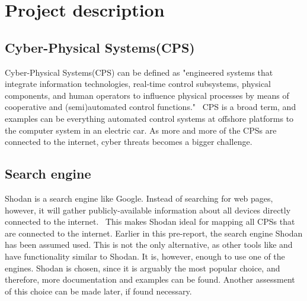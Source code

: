\section{Project description} \label{sec:desc}

\subsection{Cyber-Physical Systems(CPS)}\label{sec:cps}
Cyber-Physical Systems(CPS) can be defined as "engineered systems that integrate information technologies, real‐time control subsystems, physical components, and human operators to influence physical processes by means of cooperative and (semi)automated control functions."~\cite{guzman_wied_kozine_lundteigen_2019}
CPS is a broad term, and examples can be everything automated control systems at offshore platforms to the computer system in an electric car. As more and more of the CPSs are connected to the internet, cyber threats becomes a bigger challenge. 

\subsection{Search engine} \label{sec:shodan}
Shodan is a search engine like Google. Instead of searching for web pages, however, it will gather publicly-available information about all devices directly connected to the internet.~\cite{shodan} This makes Shodan ideal for mapping all CPSs that are connected to the internet. 
Earlier in this pre-report, the search engine Shodan has been assumed used. This is not the only alternative, as other tools like \href{https://censys.io/}{\color{blue}{Censys}} and \href{www.zoomeye.org}{\color{blue}{ZoomEye}} have functionality similar to Shodan. It is, however, enough to use one of the engines. Shodan is chosen, since it is arguably the most popular choice, and therefore, more documentation and examples can be found. Another assessment of this choice can be made later, if found necessary. 

